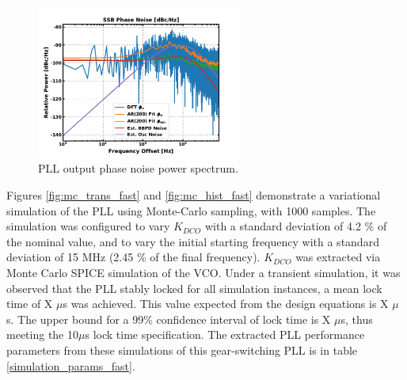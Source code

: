 			\begin{figure}[htb!]
			    \center\includegraphics[width=0.6\textwidth, angle=0]{figs/design/pipll_pn_psd2}
			    \caption{PLL output phase noise power spectrum.}
			    \label{fig:behav_sim_psd}
			\end{figure}

		\FloatBarrier
		Figures \ref{fig:mc_trans_fast} and \ref{fig:mc_hist_fast} demonstrate a variational simulation of the PLL using Monte-Carlo sampling, with 1000 samples. The simulation was configured to vary $K_{DCO}$ with a standard deviation of 4.2 \% of the nominal value, and to vary the initial starting frequency with a standard deviation of 15 MHz (2.45 \% of the final frequency). $K_{DCO}$ was extracted via Monte Carlo SPICE simulation of the VCO. Under a transient simulation, it was observed that the PLL stably locked for all simulation instances, a mean lock time of X $\mu$s was achieved. This value expected from the design equations is X $\mu$s. The upper bound for a 99\% confidence interval of lock time is X $\mu$s, thus meeting the 10$\mu$s lock time specification. The extracted PLL performance parameters from these simulations of this gear-switching PLL is in table \ref{simulation_params_fast}. 

